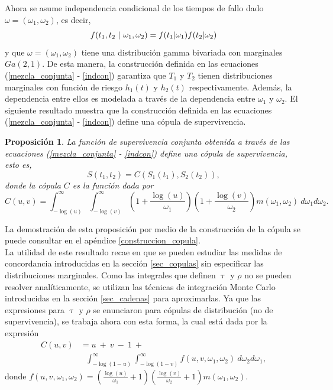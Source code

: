 \documentclass[11pt,a4paper]{article}
\newtheorem{proposition}{Proposición}[subsection]
\begin{document}
Ahora se asume independencia condicional de los tiempos de fallo dado $\omega = (\omega_1, \omega_2)$, es decir,
\begin{equation} \label{indcon}
f(t_1, t_2 \ | \ \omega_1, \omega_2) = f(t_1 | \omega_1)f(t_2 | \omega_2)\\
\end{equation}
y que $\omega = (\omega_1, \omega_2)$ tiene una distribución gamma bivariada con marginales $Ga(2, 1).$ De esta manera, la construcción definida en las ecuaciones (\ref{mezcla_conjunta} - \ref{indcon}) garantiza que $T_1$ y $T_2$ tienen distribuciones marginales con función de riesgo $h_1(t)$ y $h_2(t)$ respectivamente. Además, la dependencia entre ellos es modelada a través de la dependencia entre $\omega_1$ y $\omega_2$. El siguiente resultado muestra que la construcción definida en las ecuaciones (\ref{mezcla_conjunta} - \ref{indcon}) define una cópula de supervivencia.\\

\begin{proposition}
La función de supervivencia conjunta obtenida a través de las ecuaciones (\ref{mezcla_conjunta} - \ref{indcon}) define una cópula de supervivencia, esto es, $$S(t_1, t_2) = C(S_1(t_1), S_2(t_2)),$$ donde la cópula $C$ es la función dada por
\begin{equation} \label{copula_modelo}
C(u, v) = \int_{-\log (u)}^\infty \int_{-\log (v)}^\infty \left(1 + \frac{\log(u)}{\omega_1}\right)\left(1 + \frac{\log(v)}{\omega_2}\right) m(\omega_1, \omega_2) \ d\omega_1 d \omega_2.
\end{equation}
\end{proposition}
La demostración de esta proposición por medio de la construcción de la cópula se puede consultar en el apéndice \ref{construccion_copula}.\\

La utilidad de este resultado recae en que se pueden estudiar las medidas de concordancia introducidas en la sección \ref{sec_copulas} sin especificar las distribuciones marginales. Como las integrales que definen $\uptau$ y $\rho$ no se pueden resolver analíticamente, se utilizan las técnicas de integración Monte Carlo introducidas en la sección \ref{sec_cadenas} para aproximarlas. Ya que las expresiones para $\uptau$ y $\rho$ se enunciaron para cópulas de distribución (no de supervivencia), se trabaja ahora con esta forma, la cual está dada por la expresión
\begin{align}\label{copula_distribucion}
C(u, v) &= u \ + \ v \ - \ 1 \ +\nonumber\\ 
& \ \ \ \int_{-\log (1-u)}^\infty \int_{-\log (1-v)}^\infty f(u, v, \omega_1, \omega_2) \ d\omega_2 d\omega_1,
\end{align}
donde $f(u, v, \omega_1, \omega_2) = \left( \frac{\log (u)}{\omega_1}+1 \right) \left( \frac{\log (v)}{\omega_2}+1\right) m(\omega_1, \omega_2)$.\\
\end{document}
